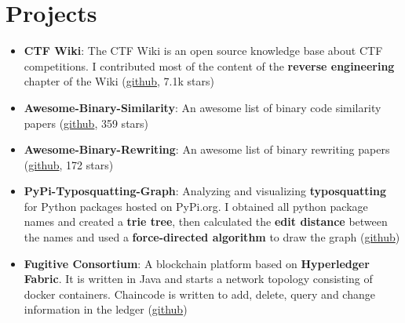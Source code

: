 \documentclass[letterpaper,10pt]{article}
\newcommand{\resumeItem}[2]{
  \item\small{
    \textbf{#1}{: #2 \vspace{-2pt}}
  }
}
\newcommand{\resumeSubItem}[2]{\resumeItem{#1}{#2}\vspace{-4pt}}
\newcommand{\resumeSubHeadingListStart}{\begin{itemize}[leftmargin=*]}
\newcommand{\resumeSubHeadingListEnd}{\end{itemize}}
\newcommand{\shorterSection}[1]{\vspace{-10pt}\section{#1}}
\begin{document}
\shorterSection{\textcolor{titleblue}{Projects}}
  \resumeSubHeadingListStart
    \resumeSubItem{CTF Wiki}
     {
     The CTF Wiki is an open source knowledge base about CTF competitions. I contributed most of the content of the \textbf{reverse engineering} chapter of the Wiki (\href{https://github.com/ctf-wiki/ctf-wiki}{\textcolor{linkblue}{github}}, 7.1k stars)
     }
    \resumeSubItem{Awesome-Binary-Similarity}
      { An awesome list of binary code similarity papers (\href{https://github.com/SystemSecurityStorm/Awesome-Binary-Similarity}{\textcolor{linkblue}{github}}, 359 stars)
	}
    \resumeSubItem{Awesome-Binary-Rewriting}
      { An awesome list of binary rewriting papers (\href{https://github.com/SystemSecurityStorm/Awesome-Binary-Rewriting}{\textcolor{linkblue}{github}}, 172 stars)
	}
	\resumeSubItem{PyPi-Typosquatting-Graph}
     { Analyzing and visualizing \textbf{typosquatting} for Python packages hosted on PyPi.org.  I obtained all python package names and created a \textbf{trie tree}, then calculated the \textbf{edit distance} between the names and used a \textbf{force-directed algorithm} to draw the graph   (\href{https://github.com/Vancir/PyPi-Typosquatting-Graph}{\textcolor{linkblue}{github}})}
    \resumeSubItem{Fugitive Consortium}
      { A blockchain platform based on \textbf{Hyperledger Fabric}. It is written in Java and starts a network topology consisting of docker containers. Chaincode is written to add, delete, query and change information in the ledger  (\href{https://github.com/Vancir/fugitivec}{\textcolor{linkblue}{github}})
	}

  \resumeSubHeadingListEnd
  
  
  
\end{document}
